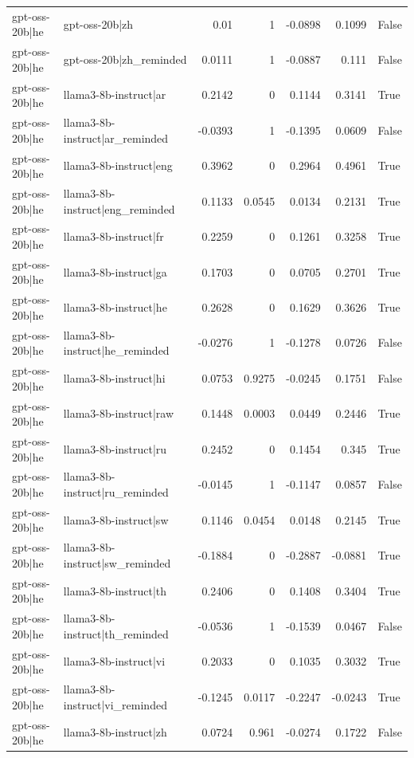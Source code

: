 \begin{table}
\begin{tabular}{l l r r r r l}
gpt-oss-20b|he & gpt-oss-20b|zh & 0.01 & 1 & -0.0898 & 0.1099 & False \\
gpt-oss-20b|he & gpt-oss-20b|zh_reminded & 0.0111 & 1 & -0.0887 & 0.111 & False \\
gpt-oss-20b|he & llama3-8b-instruct|ar & 0.2142 & 0 & 0.1144 & 0.3141 & True \\
gpt-oss-20b|he & llama3-8b-instruct|ar_reminded & -0.0393 & 1 & -0.1395 & 0.0609 & False \\
gpt-oss-20b|he & llama3-8b-instruct|eng & 0.3962 & 0 & 0.2964 & 0.4961 & True \\
gpt-oss-20b|he & llama3-8b-instruct|eng_reminded & 0.1133 & 0.0545 & 0.0134 & 0.2131 & True \\
gpt-oss-20b|he & llama3-8b-instruct|fr & 0.2259 & 0 & 0.1261 & 0.3258 & True \\
gpt-oss-20b|he & llama3-8b-instruct|ga & 0.1703 & 0 & 0.0705 & 0.2701 & True \\
gpt-oss-20b|he & llama3-8b-instruct|he & 0.2628 & 0 & 0.1629 & 0.3626 & True \\
gpt-oss-20b|he & llama3-8b-instruct|he_reminded & -0.0276 & 1 & -0.1278 & 0.0726 & False \\
gpt-oss-20b|he & llama3-8b-instruct|hi & 0.0753 & 0.9275 & -0.0245 & 0.1751 & False \\
gpt-oss-20b|he & llama3-8b-instruct|raw & 0.1448 & 0.0003 & 0.0449 & 0.2446 & True \\
gpt-oss-20b|he & llama3-8b-instruct|ru & 0.2452 & 0 & 0.1454 & 0.345 & True \\
gpt-oss-20b|he & llama3-8b-instruct|ru_reminded & -0.0145 & 1 & -0.1147 & 0.0857 & False \\
gpt-oss-20b|he & llama3-8b-instruct|sw & 0.1146 & 0.0454 & 0.0148 & 0.2145 & True \\
gpt-oss-20b|he & llama3-8b-instruct|sw_reminded & -0.1884 & 0 & -0.2887 & -0.0881 & True \\
gpt-oss-20b|he & llama3-8b-instruct|th & 0.2406 & 0 & 0.1408 & 0.3404 & True \\
gpt-oss-20b|he & llama3-8b-instruct|th_reminded & -0.0536 & 1 & -0.1539 & 0.0467 & False \\
gpt-oss-20b|he & llama3-8b-instruct|vi & 0.2033 & 0 & 0.1035 & 0.3032 & True \\
gpt-oss-20b|he & llama3-8b-instruct|vi_reminded & -0.1245 & 0.0117 & -0.2247 & -0.0243 & True \\
gpt-oss-20b|he & llama3-8b-instruct|zh & 0.0724 & 0.961 & -0.0274 & 0.1722 & False \\

\end{tabular}
\end{table}
